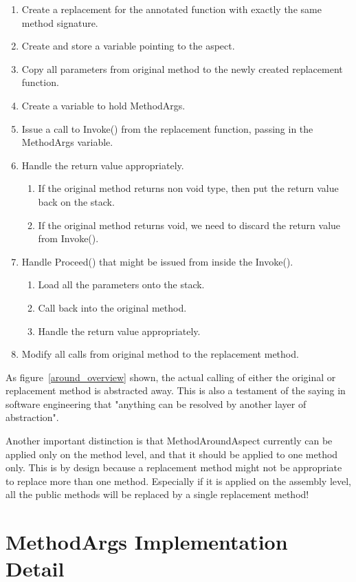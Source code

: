 \begin{enumerate}
	\item Create a replacement for the annotated function with exactly the same method signature.
	\item Create and store a variable pointing to the aspect.
	\item Copy all parameters from original method to the newly created replacement function.
	\item Create a variable to hold MethodArgs.
	\item Issue a call to Invoke() from the replacement function, passing in the MethodArgs variable.
	\item Handle the return value appropriately.
	\begin{enumerate}
		\item If the original method returns non void type, then put the return value back on the stack.
		\item If the original method returns void, we need to discard the return value from Invoke().
	\end{enumerate}
	\item Handle Proceed() that might be issued from inside the Invoke().
	\begin{enumerate}
		\item Load all the parameters onto the stack.
		\item Call back into the original method.
		\item Handle the return value appropriately.
	\end{enumerate}
	\item Modify all calls from original method to the replacement method.
\end{enumerate}

As figure~\ref{around_overview} shown, the actual calling of either the original or replacement method is abstracted away. This is also a testament of the saying in software engineering that "anything can be resolved by another layer of abstraction".

Another important distinction is that MethodAroundAspect currently can be applied only on the method level, and that it should be applied to one method only. This is by design because a replacement method might not be appropriate to replace more than one method. Especially if it is applied on the assembly level, all the public methods will be replaced by a single replacement method!

\section{MethodArgs Implementation Detail}

